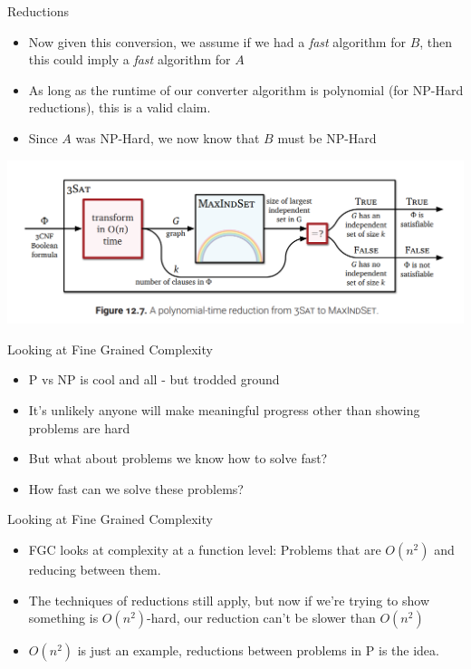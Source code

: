 \documentclass[aspectratio=169]{beamer}
\begin{document}
\begin{frame}{Reductions}
    \begin{itemize}
        \item Now given this conversion, we assume if we had a \textit{fast} algorithm for $B$, then this could imply a \textit{fast} algorithm for $A$ \pause
        \item As long as the runtime of our converter algorithm is polynomial (for NP-Hard reductions), this is a valid claim. \pause
        \item Since $A$ was NP-Hard, we now know that $B$ must be NP-Hard
    \end{itemize}
    \begin{center}
        \includegraphics[width=.8\textwidth]{reduction.png}
    \end{center}
\end{frame}

\begin{frame}{Looking at Fine Grained Complexity}
    \begin{itemize}
        \item P vs NP is cool and all - but trodded ground \pause
        \item It's unlikely anyone will make meaningful progress other than showing problems are hard \pause
        \item But what about problems we know how to solve fast? \pause
        \item How fast can we solve these problems?
    \end{itemize}
\end{frame}

\begin{frame}{Looking at Fine Grained Complexity}
    \begin{itemize}
        \item FGC looks at complexity at a function level: Problems that are $O(n^2)$ and reducing between them. \pause
        \item The techniques of reductions still apply, but now if we're trying to show something is $O(n^2)$-hard, our reduction can't be slower than $O(n^2)$
        \item $O(n^2)$ is just an example, reductions between problems in P is the idea.
    \end{itemize}
\end{frame}
\end{document}
